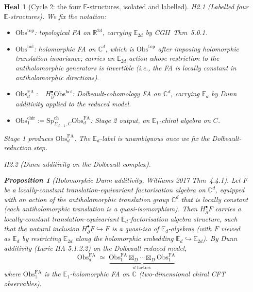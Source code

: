 \documentclass[11pt]{article}
\newtheorem{proposition}[theorem]{Proposition}
\newtheorem*{heal}{Heal}
\theoremstyle{definition}
\providecommand{\CC}{\mathbb{C}}
\providecommand{\RR}{\mathbb{R}}
\providecommand{\Obs}{\mathrm{Obs}}
\providecommand{\FA}{\mathrm{FA}}
\begin{document}
\begin{heal}[Cycle 2: the four $\mathbb{E}$-structures, isolated and labelled]

\emph{H2.1 (Labelled four $\mathbb{E}$-structures).} We fix the
notation:
\begin{itemize}[leftmargin=2em]
  \item $\Obs^{\mathrm{top}}$: topological FA on $\RR^{2d}$, carrying
        $\mathbb{E}_{2d}$ by CGII~Thm~5.0.1.
  \item $\Obs^{\mathrm{hol}}$: holomorphic FA on $\CC^d$, which is
        $\Obs^{\mathrm{top}}$ \emph{after imposing holomorphic
        translation invariance}; carries an
        $\mathbb{E}_{2d}$-action whose restriction to the antiholomorphic
        generators is invertible (i.e., the FA is locally constant in
        antiholomorphic directions).
  \item $\Obs^{\FA}_d := H^\bullet_{\bar\partial} \Obs^{\mathrm{hol}}$:
        Dolbeault-cohomology FA on $\CC^d$, carrying $\mathbb{E}_d$ by
        Dunn additivity applied to the reduced model.
  \item $\Obs^{\mathrm{chir}}_1 := \mathrm{Sp}^{\mathrm{ch}}_{\Sigma_{d-1}, C}
        \Obs^{\FA}_d$: Stage 2 output, an $\mathbb{E}_1$-chiral algebra on $C$.
\end{itemize}
Stage 1 produces \emph{$\Obs^{\FA}_d$}. The $\mathbb{E}_d$-label is
unambiguous once we fix the Dolbeault-reduction step.

\emph{H2.2 (Dunn additivity on the Dolbeault complex).}

\begin{proposition}[Holomorphic Dunn additivity, Williams 2017
Thm~4.4.1]
\label{prop:hol-dunn}
Let $F$ be a locally-constant translation-equivariant factorisation
algebra on $\CC^d$, equipped with an action of the antiholomorphic
translation group $\CC^d$ that is locally constant (each
antiholomorphic translation is a quasi-isomorphism). Then
$H^\bullet_{\bar\partial} F$ carries a locally-constant translation-equivariant
$\mathbb{E}_d$-factorisation algebra structure, such that the natural
inclusion $H^\bullet_{\bar\partial} F \hookrightarrow F$ is a quasi-iso
of $\mathbb{E}_d$-algebras (with $F$ viewed as $\mathbb{E}_d$ by
restricting $\mathbb{E}_{2d}$ along the holomorphic embedding
$\mathbb{E}_d \hookrightarrow \mathbb{E}_{2d}$). By Dunn additivity
(Lurie HA 5.1.2.2) on the Dolbeault-reduced model,
\[
  \Obs^{\FA}_d \;\simeq\; \underbrace{\Obs^{\FA}_1 \boxtimes_D \cdots \boxtimes_D \Obs^{\FA}_1}_{d \text{ factors}}
\]
where $\Obs^{\FA}_1$ is the $\mathbb{E}_1$-holomorphic FA on $\CC$
(two-dimensional chiral CFT observables).
\end{proposition}


\end{heal}
\end{document}
